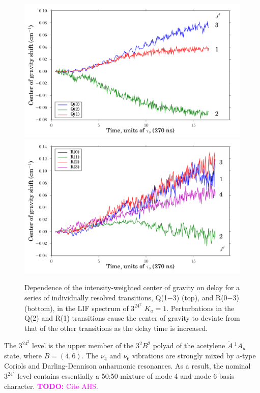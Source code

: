 \documentclass[12pt]{mitthesis}
\newcommand{\TODO} [1]{\textcolor{magenta}{\textbf{TODO:} #1}}
\newcommand{\astate}{$
  \tilde{A} \: ^1\!A_u
  $}
\newcommand{\Ka}[1]{$K_a\!\!=\!#1$}
\begin{document}
\begin{figure}
  \caption{Dependence of the intensity-weighted center of gravity on
    delay for a series of individually resolved transitions, Q(1$-$3)
    (top), and R(0$-$3) (bottom), in the LIF spectrum of $3^24^2$
    \Ka{1}.  Perturbations in the Q(2) and R(1) transitions cause the
    center of gravity to deviate from that of the other transitions as
    the delay time is increased.}
  \label{fig:32b2-cog-delay}
  \centering
  \vspace{5mm}
  \includegraphics[width=6in]{32b2-q123-cog-delay.pdf}
  \includegraphics[width=6in]{32b2-r0123-cog-delay.pdf}
\end{figure}



The $3^24^2$ level is the upper member of the $3^2B^2$ polyad of the
acetylene \astate state, where $B = (4, 6)$.  The $\nu_4$ and $\nu_6$
vibrations are strongly mixed by a-type Coriols and Darling-Dennison
anharmonic resonances.  As a result, the nominal $3^24^2$ level
contains essentially a 50:50 mixture of mode 4 and mode 6 basis
character.  \TODO{Cite AHS.}
\end{document}
